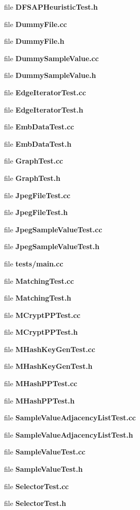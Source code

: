 \begin{DoxyCompactItemize}
\item 
file \textbf{ D\+F\+S\+A\+P\+Heuristic\+Test.\+h}
\item 
file \textbf{ Dummy\+File.\+cc}
\item 
file \textbf{ Dummy\+File.\+h}
\item 
file \textbf{ Dummy\+Sample\+Value.\+cc}
\item 
file \textbf{ Dummy\+Sample\+Value.\+h}
\item 
file \textbf{ Edge\+Iterator\+Test.\+cc}
\item 
file \textbf{ Edge\+Iterator\+Test.\+h}
\item 
file \textbf{ Emb\+Data\+Test.\+cc}
\item 
file \textbf{ Emb\+Data\+Test.\+h}
\item 
file \textbf{ Graph\+Test.\+cc}
\item 
file \textbf{ Graph\+Test.\+h}
\item 
file \textbf{ Jpeg\+File\+Test.\+cc}
\item 
file \textbf{ Jpeg\+File\+Test.\+h}
\item 
file \textbf{ Jpeg\+Sample\+Value\+Test.\+cc}
\item 
file \textbf{ Jpeg\+Sample\+Value\+Test.\+h}
\item 
file \textbf{ tests/main.\+cc}
\item 
file \textbf{ Matching\+Test.\+cc}
\item 
file \textbf{ Matching\+Test.\+h}
\item 
file \textbf{ M\+Crypt\+P\+P\+Test.\+cc}
\item 
file \textbf{ M\+Crypt\+P\+P\+Test.\+h}
\item 
file \textbf{ M\+Hash\+Key\+Gen\+Test.\+cc}
\item 
file \textbf{ M\+Hash\+Key\+Gen\+Test.\+h}
\item 
file \textbf{ M\+Hash\+P\+P\+Test.\+cc}
\item 
file \textbf{ M\+Hash\+P\+P\+Test.\+h}
\item 
file \textbf{ Sample\+Value\+Adjacency\+List\+Test.\+cc}
\item 
file \textbf{ Sample\+Value\+Adjacency\+List\+Test.\+h}
\item 
file \textbf{ Sample\+Value\+Test.\+cc}
\item 
file \textbf{ Sample\+Value\+Test.\+h}
\item 
file \textbf{ Selector\+Test.\+cc}
\item 
file \textbf{ Selector\+Test.\+h}
\item 

\end{DoxyCompactItemize}
